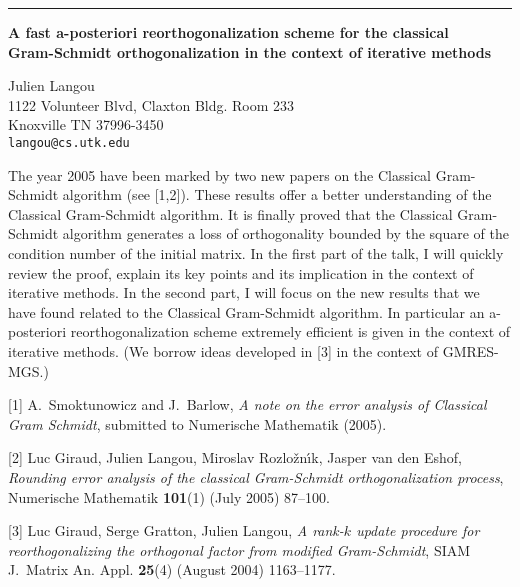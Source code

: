\documentclass[twosided]{report}
\begin{document}
	\begin{center} \rule{6in}{1pt} \end{center}

\begin{center}
{\large			%
{\bf A fast a-posteriori reorthogonalization scheme for the classical \\
	Gram-Schmidt orthogonalization in the context of iterative methods}}

	Julien Langou \\
	1122 Volunteer Blvd, Claxton Bldg. Room 233 \\
	Knoxville TN 37996-3450 \\
	{\tt langou@cs.utk.edu}
\end{center}
The year 2005 have been marked by two new papers on the
Classical Gram-Schmidt algorithm (see [1,2]). These results
offer a better understanding of the Classical Gram-Schmidt
algorithm. It is finally proved that the Classical
Gram-Schmidt algorithm generates a loss of orthogonality
bounded by the square of the condition number of the initial
matrix. In the first part of the talk, I will quickly review
the proof, explain its key points and its implication in the
context of iterative methods. In the second part, I will
focus on the new results that we have found related to the
Classical Gram-Schmidt algorithm. In particular an
a-posteriori reorthogonalization scheme extremely efficient
is given in the context of iterative methods. (We borrow
ideas developed in [3] in the context of GMRES-MGS.)

[1] A.~Smoktunowicz and J.~Barlow,
{\em A note on the error analysis of Classical Gram Schmidt},
submitted to Numerische Mathematik (2005).

[2] Luc Giraud, Julien Langou, Miroslav Rozlo\v{z}n\'{\i}k,
Jasper van den Eshof, {\em Rounding error analysis of
the classical Gram-Schmidt orthogonalization process},
Numerische Mathematik {\bf 101}(1) (July 2005) 87--100.

[3] Luc Giraud, Serge Gratton, Julien Langou,
{\em A rank-$k$ update procedure for
reorthogonalizing the orthogonal factor from modified
Gram-Schmidt}, SIAM J.~Matrix An. Appl. {\bf 25}(4)
(August 2004) 1163--1177.
\end{document}
